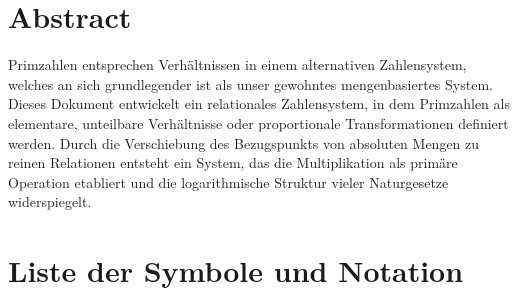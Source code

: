 \section*{Abstract}
		Primzahlen entsprechen Verhältnissen in einem alternativen Zahlensystem, welches an sich grundlegender ist als unser gewohntes mengenbasiertes System. Dieses Dokument entwickelt ein relationales Zahlensystem, in dem Primzahlen als elementare, unteilbare Verhältnisse oder proportionale Transformationen definiert werden. Durch die Verschiebung des Bezugspunkts von absoluten Mengen zu reinen Relationen entsteht ein System, das die Multiplikation als primäre Operation etabliert und die logarithmische Struktur vieler Naturgesetze widerspiegelt.

	
	
	\section{Liste der Symbole und Notation}
	
